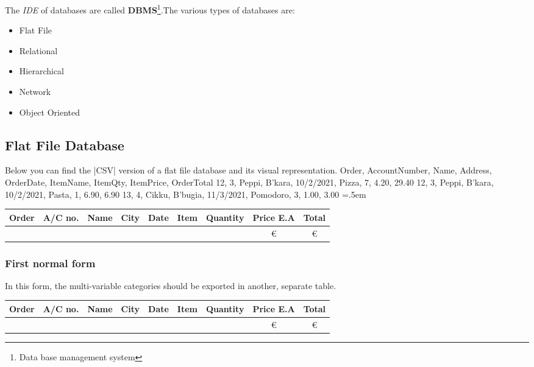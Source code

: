 \documentclass{article}
\newenvironment{lcverbatim}
{\SaveVerbatim{cverb}}
{\endSaveVerbatim
	\flushleft\fboxrule=0pt\fboxsep=.5em
	\colorbox{cverbbg}{%
		\makebox[\dimexpr\linewidth-2\fboxsep][l]{\BUseVerbatim{cverb}}%
	}
	\endflushleft
}
\begin{document}
		The \textit{IDE} of databases are called \textbf{DBMS}\footnote{Data base management system}.The various types of databases are: 
		\begin{itemize}
			\item{Flat File}
			\item{Relational}
			\item{Hierarchical}
			\item{Network}
			\item{Object Oriented}
		\end{itemize}
	\subsection{Flat File Database}
	Below you can find the \cverb|CSV| version of a flat file database and its visual representation.
\begin{lcverbatim}
Order, AccountNumber, Name, Address, OrderDate, ItemName, ItemQty, ItemPrice, OrderTotal
12, 3, Peppi, B'kara, 10/2/2021, Pizza, 7, 4.20, 29.40
12, 3, Peppi, B'kara, 10/2/2021, Pasta, 1, 6.90, 6.90 
13, 4, Cikku, B'bugia, 11/3/2021, Pomodoro, 3, 1.00, 3.00
\end{lcverbatim}
\begin{center}
		\begin{tabular}{|c|c|c|c|c|c|c|c|c|}%
		\hline
		\bfseries Order & \bfseries A/C no. & \bfseries Name &\bfseries City &\bfseries Date & \bfseries Item &\bfseries Quantity &\bfseries Price E.A &\bfseries Total 
		\csvreader[head to column names]{flat_file.csv}{}%
		{\\\hline\Order & \AccountNumber &  \Name & \Address & \OrderDate & \ItemName & \ItemQty & \euro\ItemPrice & \euro\OrderTotal}
		\\\hline
	\end{tabular}
\end{center}
\subsubsection{First normal form}
In this form, the multi-variable categories should be exported in another, separate table.

\begin{center}
	\begin{tabular}{|c|c|c|c|c|c|c|c|c|}%
		\hline
		\bfseries Order & \bfseries A/C no. & \bfseries Name &\bfseries City &\bfseries Date & \bfseries Item &\bfseries Quantity &\bfseries Price E.A &\bfseries Total 
		\csvreader[head to column names]{flat_file.csv}{}%
		{\\\hline\Order & \AccountNumber &  \Name & \Address & \OrderDate & \ItemName & \ItemQty & \euro\ItemPrice & \euro\OrderTotal}
		\\\hline
	\end{tabular}
\end{center}
\end{document}
